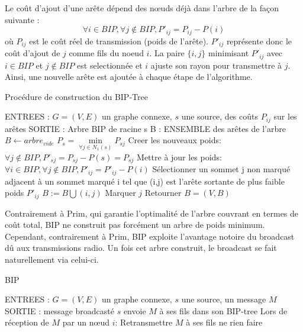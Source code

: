 Le coût d'ajout d'une arête dépend des nœuds déjà dans l'arbre de la façon suivante : 
$$ \forall i \in BIP, \forall j \notin BIP, P'_{ij}=P_{ij}-P(i)$$
où $P_{ij}$ est le coût réel de transmission (poids de l'arête). $P'_{ij}$ représente donc le coût d'ajout de $j$ comme fils du noeud $i$. La paire $\{i,j\}$ minimisant $P'_{ij}$ avec $i \in BIP$ et $j \not\in BIP$ est selectionnée et $i$ ajuste son rayon pour transmettre à $j$. Ainsi, une nouvelle arête est ajoutée à chaque étape de l'algorithme.\\


\begin{algorithm}[h]
\caption{Procédure de construction du BIP-Tree}
\label{algo_BIP_tree}
\begin{algorithmic}
\STATE ENTREES :  $G=(V,E)$ un graphe connexe, $s$ une source, des coûts $P_{ij}$ sur les arêtes 
\STATE SORTIE : Arbre BIP de racine s
\STATE B : ENSEMBLE des arêtes de l'arbre
\STATE  $B \leftarrow arbre_{vide}$
\STATE $P_s = \min \limits_{\forall j \in N_1(s)}{P_{sj}}$
\STATE Creer les nouveaux poids: $\forall j \notin BIP, P'_{sj}=P_{sj}-P(s)=P_{sj}$
   \STATE Mettre à jour les poids:  $ \forall i \in BIP, \forall j \notin BIP, P'_{ij}=P'_{ij}-P(i)$
   \STATE Sélectionner un sommet j non marqué adjacent à un sommet marqué i tel que (i,j) est l'arête sortante de plus faible poids $P'_{ij}$
   \STATE $B := B\bigcup   {(i,j)}$
   \STATE Marquer $j$
\ENDWHILE
\STATE Retourner $B=(V,B)$
\end{algorithmic}
\end{algorithm}

Contrairement à Prim, qui garantie l'optimalité de l'arbre couvrant en termes de coût total,
BIP ne construit pas forcément un arbre de poids minimum. Cependant, contrairement à Prim, BIP exploite l'avantage notoire du broadcast dû aux transmissions radio. Un fois cet arbre construit, le broadcast se fait naturellement via celui-ci.


\begin{algorithm}[h]
\caption{BIP}
\label{algo_BIP}
\begin{algorithmic}
\STATE ENTREES :  $G=(V,E)$ un graphe connexe, $s$ une source, un message $M$
\STATE SORTIE : message broadcasté
\STATE $s$ envoie $M$ à ses fils dans son BIP-tree
\STATE Lors de réception de $M$ par un nœud $i$:
	\STATE Retransmettre $M$ à ses fils
\ELSE
	\STATE ne rien faire
\ENDIF
\end{algorithmic}
\end{algorithm}

